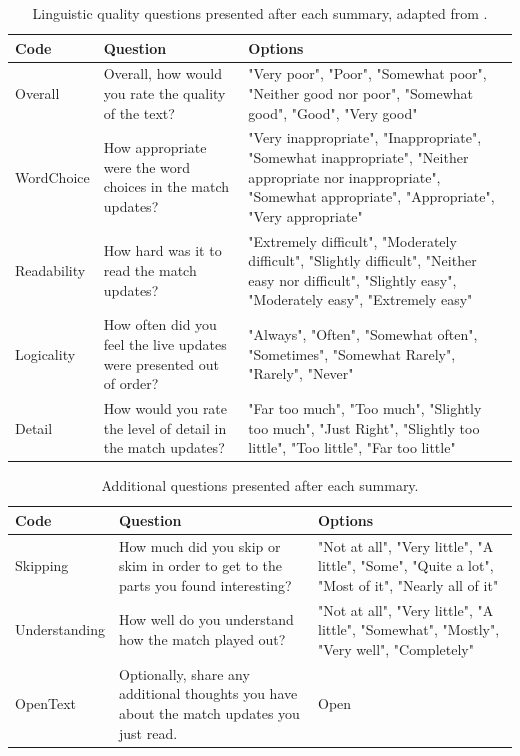 \renewcommand{\arraystretch}{1.5}
\begin{table}[H]
  \centering\small\sloppy
  \begin{tabularx}{\textwidth}{>{\RaggedRight\arraybackslash}p{2.5cm} >{\RaggedRight\arraybackslash}X >{\RaggedRight\arraybackslash}X}
    \textbf{Code} & \textbf{Question} & \textbf{Options} \\
    \midrule
    Overall & Overall, how would you rate the quality of the text? & "Very poor", "Poor", "Somewhat poor", "Neither good nor poor", "Somewhat good", "Good", "Very good" \\
    WordChoice & How appropriate were the word choices in the match updates? & "Very inappropriate", "Inappropriate", "Somewhat inappropriate", "Neither appropriate nor inappropriate", "Somewhat appropriate", "Appropriate", "Very appropriate" \\
    Readability & How hard was it to read the match updates? & "Extremely difficult", "Moderately difficult", "Slightly difficult", "Neither easy nor difficult", "Slightly easy", "Moderately easy", "Extremely easy" \\
    Logicality & How often did you feel the live updates were presented out of order? & "Always", "Often", "Somewhat often", "Sometimes", "Somewhat Rarely", "Rarely", "Never" \\
    Detail & How would you rate the level of detail in the match updates? & "Far too much", "Too much", "Slightly too much", "Just Right", "Slightly too little", "Too little", "Far too little" \\
  \end{tabularx}
  \caption{Linguistic quality questions presented after each summary, adapted from \cite{callaway2002}.}
  \label{tab:linguistic-questions}
\end{table}

\renewcommand{\arraystretch}{1.5}
\begin{table}[H]
  \centering\small\sloppy
  \begin{tabularx}{\textwidth}{>{\RaggedRight\arraybackslash}p{2.5cm} >{\RaggedRight\arraybackslash}X >{\RaggedRight\arraybackslash}X}
    \textbf{Code} & \textbf{Question} & \textbf{Options} \\
    \midrule
    Skipping & How much did you skip or skim in order to get to the parts you found interesting? & "Not at all", "Very little", "A little", "Some", "Quite a lot", "Most of it", "Nearly all of it" \\
    Understanding & How well do you understand how the match played out? & "Not at all", "Very little", "A little", "Somewhat", "Mostly", "Very well", "Completely" \\
    OpenText & Optionally, share any additional thoughts you have about the match updates you just read. & Open \\
  \end{tabularx}
  \caption{Additional questions presented after each summary.}
  \label{tab:additional-questions}
\end{table}

